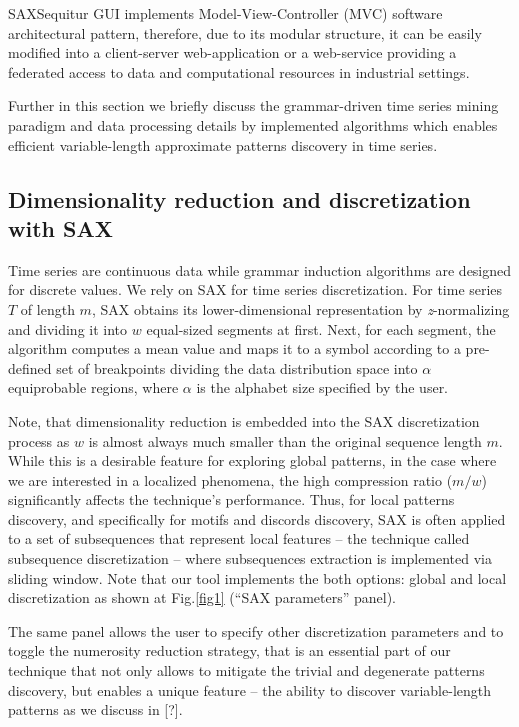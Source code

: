 \documentclass{llncs}
\begin{document}
SAXSequitur GUI implements Model-View-Controller (MVC) software architectural pattern, therefore, due to its modular structure, it can be easily modified into a client-server web-application or a web-service providing a federated access to data and computational resources in industrial settings. 

Further in this section we briefly discuss the grammar-driven time series mining paradigm and data processing details by implemented algorithms which enables efficient variable-length approximate patterns discovery in time series.

\subsection{Dimensionality reduction and discretization with SAX}
Time series are continuous data while grammar induction algorithms are designed for discrete values. We rely on SAX \cite{sax} for time series discretization. For time series $T$ of length $m$, SAX obtains its lower-dimensional representation by \textit{z}-normalizing and dividing it into $w$ equal-sized segments at first. Next, for each segment, the algorithm computes a mean value and maps it to a symbol according to a pre-defined set of breakpoints dividing the data distribution space into $\alpha$ equiprobable regions, where $\alpha$ is the alphabet size specified by the user. 

Note, that dimensionality reduction is embedded into the SAX discretization process as $w$ is almost always much smaller than the original sequence length $m$. While this is a desirable feature for exploring global patterns, in the case where we are interested in a localized phenomena, the high compression ratio ($m/w$) significantly affects the technique's performance. Thus, for local patterns discovery, and specifically for motifs and discords discovery, SAX is often applied to a set of subsequences that represent local features -- the technique called subsequence discretization \cite{lin_motifs} -- where subsequences extraction is implemented via sliding window. Note that our tool implements the both options: global and local discretization as shown at Fig.\ref{fig1} (``SAX parameters'' panel). 

The same panel allows the user to specify other discretization parameters and to toggle the numerosity reduction strategy, that is an essential part of our technique that not only allows to mitigate the trivial and degenerate patterns discovery, but enables a unique feature -- the ability to discover variable-length patterns as we discuss in [?]. 
\end{document}
